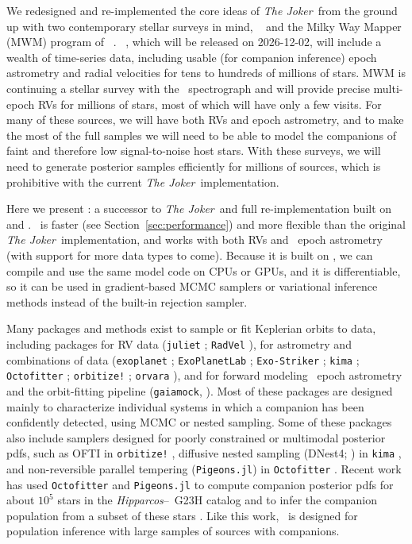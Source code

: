 \documentclass[twocolumn]{AASTeX7/aastex701}
\newcommand{\harv}{\package{harv}}
\newcommand{\joker}{\textsl{The Joker}}
\begin{document}
We redesigned and re-implemented the core ideas of \joker\ from the ground up with two
contemporary stellar surveys in mind, \gaia\  and the Milky Way Mapper (MWM)
program of \sdssv\ \citep{Kollmeier:2026}.
\gaia\ , which will be released on 2026-12-02, will include a wealth of
time-series data, including usable (for companion inference) epoch astrometry and radial
velocities for tens to hundreds of millions of stars.
MWM is continuing a stellar survey with the \apogee\ spectrograph and will provide
precise multi-epoch RVs for millions of stars, most of which will have only a few
visits.
For many of these sources, we will have both RVs and epoch astrometry, and to make the
most of the full samples we will need to be able to model the companions of faint and
therefore low signal-to-noise host stars.
With these surveys, we will need to generate posterior samples efficiently for
millions of sources, which is prohibitive with the current \joker\ implementation.

Here we present \harv: a successor to \joker\ and full re-implementation built on \jax\
\citep{Bradbury:2018} and  \citep{phan2019composable, bingham2019pyro}.
\harv\ is faster (see Section~\ref{sec:performance}) and more flexible than the original
\joker\ implementation, and works with both RVs and \gaia\ epoch astrometry (with
support for more data types to come).
Because it is built on \jax, we can compile and use the same model code on CPUs or GPUs,
and it is differentiable, so it can be used in gradient-based MCMC samplers or
variational inference methods instead of the built-in rejection sampler.

Many packages and methods exist to sample or fit Keplerian orbits to data, including
packages for RV data (\texttt{juliet} \citealt{Espinoza:2019};
  \texttt{RadVel} \citealt{Fulton:2018}),
for astrometry and combinations of data (\texttt{exoplanet}
\citealt{Foreman-Mackey:2021};
  \texttt{ExoPlanetLab} \citealt{Hobbs:2026};
  \texttt{Exo-Striker} \citealt{Trifonov:2019};
  \texttt{kima} \citealt{Faria:2018};
  \texttt{Octofitter} \citealt{Thompson:2023};
  \texttt{orbitize!} \citealt{Blunt:2020};
  \texttt{orvara} \citealt{Brandt:2021}),
and for forward modeling \gaia\ epoch astrometry and the  orbit-fitting pipeline
(\texttt{gaiamock}, \citealt{ElBadry:2024-gaiamock}).
Most of these packages are designed mainly to characterize individual systems in which a
companion has been confidently detected, using MCMC or nested sampling.
Some of these packages also include samplers designed for poorly constrained or
multimodal posterior pdfs, such as OFTI in \texttt{orbitize!} \citep{Blunt:2017},
diffusive nested sampling (DNest4; \citealt{Brewer:2014}) in \texttt{kima}
\citep{Faria:2018}, and non-reversible parallel tempering (\texttt{Pigeons.jl}) in
\texttt{Octofitter} \citep{Surjanovic:2023}.
Recent work has used \texttt{Octofitter} and \texttt{Pigeons.jl} to compute companion
posterior pdfs for about $10^5$ stars in the \textit{Hipparcos}--\gaia\ G23H catalog
\citep{Thompson:2026a} and to infer the companion population from a subset of these
stars \citep{Thompson:2026b}.
Like this work, \harv\ is designed for population inference with large samples of
sources with companions.
\end{document}
